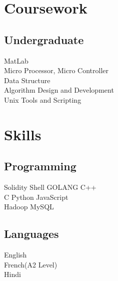 \documentclass[]{deedy-resume-openfont}
\begin{document}
\begin{minipage}[t]{0.33\textwidth}
\section{Coursework}


\subsection{Undergraduate}
MatLab\\
Micro Processor, Micro Controller \\
Data Structure \\
Algorithm Design and Development \\
Unix Tools and Scripting \\
\sectionsep


\section{Skills}
\subsection{Programming}
Solidity \textbullet{}   Shell \textbullet{} GOLANG \textbullet{} C++ \\
C \textbullet{} Python \textbullet{} JavaScript  \\
Hadoop \textbullet{} MySQL
\sectionsep

\subsection{Languages}
\textbullet{} English \\
\textbullet{} French(A2 Level) \\
\textbullet{} Hindi \\
\sectionsep

%
%

\end{minipage}
\hfill
\end{document}

